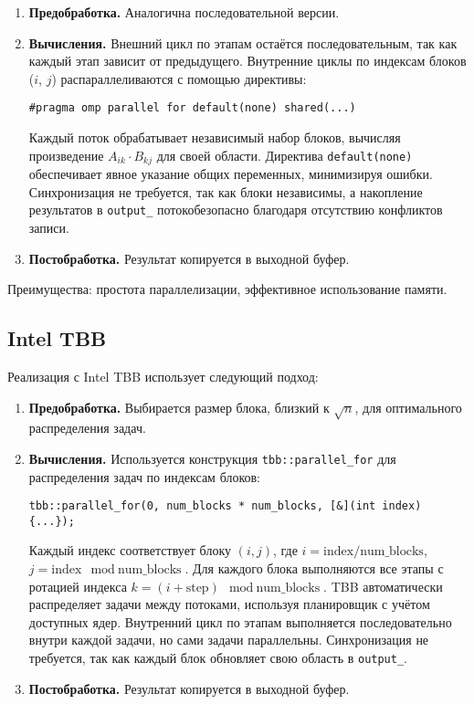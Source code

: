 \documentclass[12pt]{article}
\begin{document}
\begin{enumerate}
  \item \textbf{Предобработка.} Аналогична последовательной версии.
    \item \textbf{Вычисления.} Внешний цикл по этапам остаётся последовательным, так как каждый этап зависит от предыдущего. Внутренние циклы по индексам блоков ($i$, $j$) распараллеливаются с помощью директивы:
    \begin{lstlisting}
#pragma omp parallel for default(none) shared(...)
    \end{lstlisting}
    Каждый поток обрабатывает независимый набор блоков, вычисляя произведение $A_{ik} \cdot B_{kj}$ для своей области. Директива \texttt{default(none)} обеспечивает явное указание общих переменных, минимизируя ошибки. Синхронизация не требуется, так как блоки независимы, а накопление результатов в \texttt{output\_} потокобезопасно благодаря отсутствию конфликтов записи.
    \item \textbf{Постобработка.} Результат копируется в выходной буфер.
\end{enumerate}

Преимущества: простота параллелизации, эффективное использование памяти.

\subsection{Intel TBB}

Реализация с Intel TBB использует следующий подход:

\begin{enumerate}
  \item \textbf{Предобработка.} Выбирается размер блока, близкий к $\sqrt{n}$, для оптимального распределения задач.
    \item \textbf{Вычисления.} Используется конструкция \texttt{tbb::parallel\_for} для распределения задач по индексам блоков:
    \begin{lstlisting}
tbb::parallel_for(0, num_blocks * num_blocks, [&](int index) {...});
    \end{lstlisting}
    Каждый индекс соответствует блоку $(i, j)$, где $i = \text{index} / \text{num\_blocks}$, $j = \text{index} \mod \text{num\_blocks}$. Для каждого блока выполняются все этапы с ротацией индекса $k = (i + \text{step}) \mod \text{num\_blocks}$. TBB автоматически распределяет задачи между потоками, используя планировщик с учётом доступных ядер. Внутренний цикл по этапам выполняется последовательно внутри каждой задачи, но сами задачи параллельны. Синхронизация не требуется, так как каждый блок обновляет свою область в \texttt{output\_}.
    \item \textbf{Постобработка.} Результат копируется в выходной буфер.
\end{enumerate}
\end{document}
